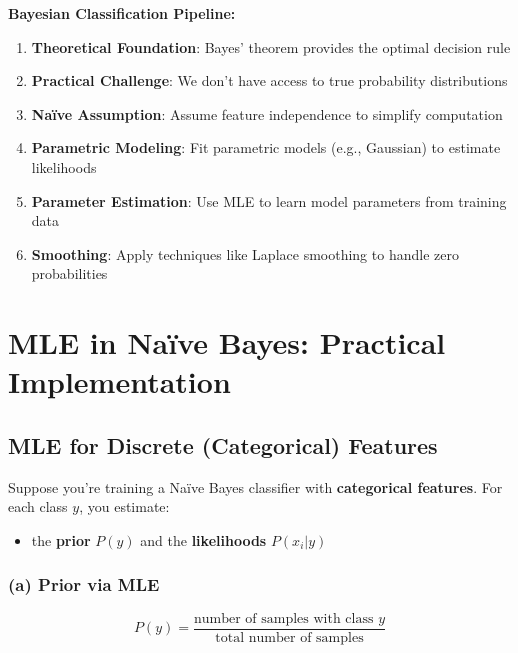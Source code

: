 \documentclass[11pt,a4paper]{article}
\theoremstyle{definition}
\theoremstyle{plain}
\theoremstyle{remark}
\begin{document}
\begin{center}
\colorbox{purple!15}{\parbox{0.9\textwidth}{
\textbf{Bayesian Classification Pipeline:}
\begin{enumerate}
    \item \textbf{Theoretical Foundation}: Bayes' theorem provides the optimal decision rule
    \item \textbf{Practical Challenge}: We don't have access to true probability distributions
    \item \textbf{Naïve Assumption}: Assume feature independence to simplify computation
    \item \textbf{Parametric Modeling}: Fit parametric models (e.g., Gaussian) to estimate likelihoods
    \item \textbf{Parameter Estimation}: Use MLE to learn model parameters from training data
    \item \textbf{Smoothing}: Apply techniques like Laplace smoothing to handle zero probabilities
\end{enumerate}
}}
\end{center}

\section{MLE in Naïve Bayes: Practical Implementation}

\subsection{MLE for Discrete (Categorical) Features}

Suppose you're training a Naïve Bayes classifier with \textbf{categorical features}. For each class $y$, you estimate:
\begin{itemize}
    \item the \textbf{prior} $P(y)$ and the \textbf{likelihoods} $P(x_i | y)$
\end{itemize}

\subsubsection{(a) Prior via MLE}

\begin{tcolorbox}[colback=blue!5!white,colframe=blue!75!black,title=\textbf{Prior Estimation}]
\[
P(y) = \frac{\text{number of samples with class } y}{\text{total number of samples}}
\]
\end{tcolorbox}
\end{document}

